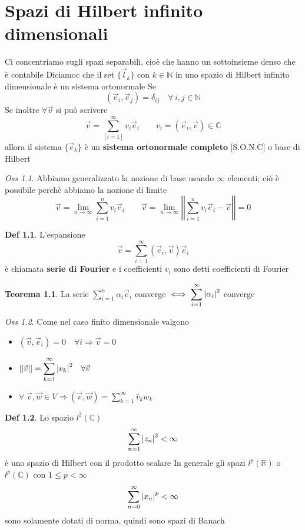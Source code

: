 \documentclass[a4paper,11pt]{report}
\theoremstyle{remark}
\newtheorem*{oss}{Oss}
\theoremstyle{definition}
\newtheorem*{teo}{Teorema}
\newtheorem*{Def}{Def}
\newcommand{\C}{\mathbb{C}}
\newcommand{\R}{\mathbb{R}}
\DeclarePairedDelimiter{\abs}{\lvert}{\rvert}
\begin{document}
\chapter{Spazi di Hilbert infinito dimensionali}
Ci concentriamo sugli spazi separabili, cioè che hanno un sottoinsieme denso che è contabile \newline
Diciamoc che il set $\{\vec{l}_k\}$ con $k\in \mathbb{N}$ in uno spazio di Hilbert infinito dimensionale è un sistema ortonormale Se
\[(\vec{e}_i,\vec{e}_j) = \delta_{ij} \quad \forall \, i,j \in \mathbb{N} \]
Se inoltre $\forall \vec{v}$ si può scrivere
\[\vec{v} = \sum_[i=1]^\infty v_i\vec{e}_i \qquad v_i = (\vec{e}_i,\vec{v})\in \C\]
allora il sistema $\{\vec{e}_k\}$ è un \textbf{sistema ortonormale completo} [S.O.N.C] o base di Hilbert

\begin{oss}
	Abbiamo generalizzato la nozione di base usando $\infty$ elementi; ciò è possibile perchè abbiamo la nozione di limite
	\[\vec{v} = \lim_{n\to\infty} \sum_{i=1}^n v_i\vec{e}_i \qquad \vec{v} = \lim_{n\to\infty} \left|\left| \sum_{i=1}^n v_i\vec{e}_i - \vec{v}\right| \right| =0\] 
\end{oss}

\begin{Def}
	L'espansione 
	\[\vec{v} = \sum_{i=1}^\infty (\vec{e}_i,\vec{v})\vec{e}_i\]
	è chiamata \textbf{serie di Fourier} e i coefficienti $v_i$ sono detti coefficienti di Fourier
\end{Def}

\begin{teo}
	La serie $\displaystyle \sum_{i=1}^n \alpha_i\vec{e}_i$ converge $\iff \displaystyle \sum_{i=1}^\infty {\abs{\alpha_i}}^2$ converge 
\end{teo}

\begin{oss}
	Come nel caso finito dimensionale valgono
	\begin{itemize}
		\item $(\vec{v},\vec{e}_i) = 0 \quad \forall i \Rightarrow \vec{v}=0$
  \item $||\vec{v}|| = \displaystyle \sum_{k=1}^\infty {\abs{v_k}}^2 \quad \forall\vec{v}$
  \item $\forall \; \vec{v},\vec{w} \in V \Rightarrow (\vec{v},\vec{w}) = \displaystyle \sum_{k=1}^\infty \bar{v}_kw_k$
	\end{itemize}
\end{oss}

\begin{Def}
	Lo spazio $l^2(\C)$
	\[\sum_{n=1}^\infty {\abs{z_n}}^2 < \infty\]
	è uno spazio di Hilbert con il prodotto scalare \newline
	In generale gli spazi $l^p(\R)$ o $l^p(\C)$ con $1 \le p <\infty$
	\[\sum_{n=0}^\infty {\abs{x_n}}^p < \infty\]
	sono solamente dotati di norma, quindi sono spazi di Banach 
\end{Def}
\end{document}
